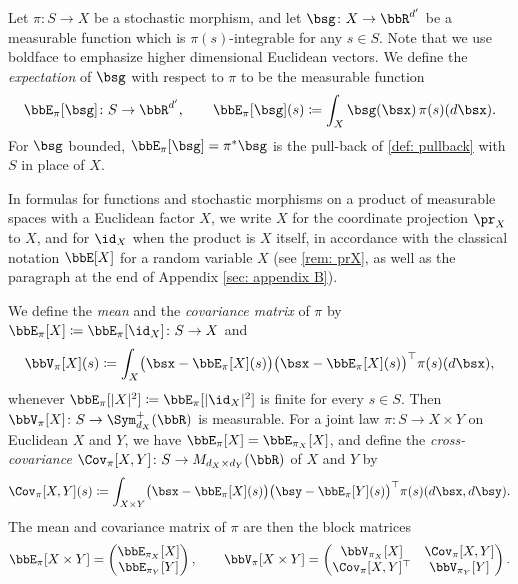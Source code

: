 \documentclass[12pt,reqno]{amsart}%
\theoremstyle{plain}
\theoremstyle{definition}
\def\R{\bbR}
\def\abs#1{|#1|}
\begin{document}
Let $\pi\colon S\rightarrow X$ be a stochastic morphism, and let $\bsg\colon X\rightarrow\R^{d'}$ be a measurable function
which is $\pi(s)$-integrable for any $s\in S$.
Note that we use boldface to emphasize higher dimensional Euclidean vectors.
We define the \emph{expectation} of $\bsg$ with respect to $\pi$ to be the measurable function
\[
	\bbE_\pi[\bsg]\colon S\rightarrow\R^{d'},\qquad
	\bbE_\pi[\bsg](s)\coloneqq\int_X\bsg(\bsx)\,\pi(s)(d\bsx).
\]
For $\bsg$ bounded, $\bbE_\pi[\bsg]=\pi^*\bsg$ is the pull-back of \cref{def: pullback} with $S$ in place of $X$.

\begin{remark}\label{rem: X}
	In formulas for functions and stochastic morphisms on a product of measurable spaces
	with a Euclidean factor $X$, we write $X$ for the coordinate projection $\pr_X$ to $X$,
	and for $\id_X$ when the product is $X$ itself, in accordance with the classical notation
	$\bbE[X]$ for a random variable $X$ (see \cref{rem: prX}, as well as 
	the paragraph at the end of Appendix \ref{sec: appendix B}).
\end{remark}

We define the \emph{mean} and the \emph{covariance matrix} of $\pi$ by 
$
	\bbE_\pi[X]\coloneqq\bbE_\pi[\id_X]\colon S\rightarrow X
$ 
and
\[
	\bbV_\pi[X](s)\coloneqq\int_X\bigl(\bsx-\bbE_\pi[X](s)\bigr)\bigl(\bsx-\bbE_\pi[X](s)\bigr)^{\top}\pi(s)(d\bsx),
\]
whenever $\bbE_\pi[\abs{X}^2]\coloneqq\bbE_\pi[\abs{\id_X}^2]$ is finite for every $s\in S$.  Then $\bbV_\pi[X]\colon S\rightarrow\Sym^+_{d_X}(\R)$ is measurable.
For a joint law $\pi\colon S\rightarrow X\times Y$ on Euclidean $X$ and $Y$, we have
$\bbE_\pi[X]=\bbE_{\pi_X}[X]$, and define the \emph{cross-covariance}
$\Cov_\pi[X,Y]\colon S\rightarrow M_{d_X\times d_Y}(\R)$
of $X$ and $Y$ by
\[
	\Cov_\pi[X,Y](s)\coloneqq\int_{X\times Y}\bigl(\bsx-\bbE_\pi[X](s)\bigr)\bigl(\bsy-\bbE_\pi[Y](s)\bigr)^{\top}\pi(s)(d\bsx,d\bsy).
\]
The mean and covariance matrix of $\pi$ are then the block matrices
\begin{equation}\label{eq: block}
	\bbE_\pi[X\times Y]=\begin{pmatrix}\bbE_{\pi_X}[X]\\ \bbE_{\pi_Y}[Y]\end{pmatrix},\qquad
	\bbV_\pi[X\times Y]=\begin{pmatrix}
		\bbV_{\pi_X}[X] & \Cov_\pi[X,Y]\\
		\Cov_\pi[X,Y]^{\top} & \bbV_{\pi_Y}[Y]
	\end{pmatrix}.
\end{equation}
\end{document}
